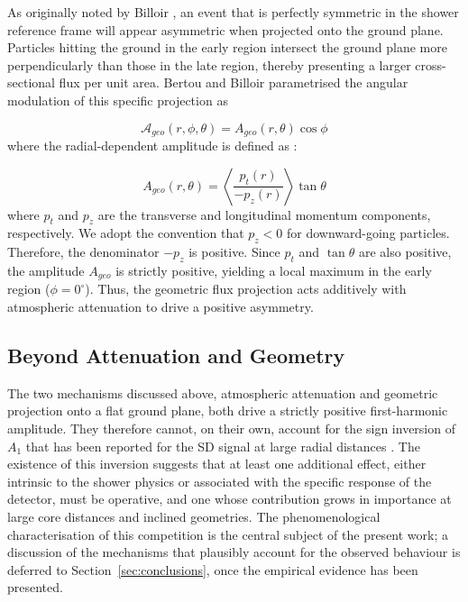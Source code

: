 \documentclass[11pt,a4paper]{article}
\begin{document}
As originally noted by Billoir \cite{GAP2000_017}, an event that is perfectly symmetric in the shower reference frame will appear asymmetric when projected onto the ground plane. Particles hitting the ground in the early region intersect the ground plane more perpendicularly than those in the late region, thereby presenting a larger cross-sectional flux per unit area. Bertou and Billoir parametrised the angular modulation of this specific projection as

\begin{equation}
    \mathcal{A}_{geo}(r, \phi, \theta) = A_{geo}(r, \theta) \cos \phi
    \label{eq:geometric_effect_full}
\end{equation}
%
where the radial-dependent amplitude is defined as \cite{GAP2000_017}:

\begin{equation}
    A_{geo}(r, \theta) = \left\langle \frac{p_t(r)}{-p_z(r)} \right\rangle \tan \theta
    \label{eq:geometric_effect}
\end{equation}
%
where $p_t$ and $p_z$ are the transverse and longitudinal momentum components, respectively. We adopt the convention that $p_z < 0$ for downward-going particles. Therefore, the denominator $-p_z$ is positive. Since $p_t$ and $\tan\theta$ are also positive, the amplitude $A_{geo}$ is strictly positive, yielding a local maximum in the early region ($\phi = 0^\circ$). Thus, the geometric flux projection acts additively with atmospheric attenuation to drive a positive asymmetry.

\subsection{Beyond Attenuation and Geometry}
\label{subsec:beyond}

The two mechanisms discussed above, atmospheric attenuation and geometric projection onto a flat ground plane, both drive a strictly positive first-harmonic amplitude. They therefore cannot, on their own, account for the sign inversion of $A_1$ that has been reported for the SD signal at large radial distances \cite{BradfieldThesis, Luce_ICRC2021, GAP2000_017}. The existence of this inversion suggests that at least one additional effect, either intrinsic to the shower physics or associated with the specific response of the detector, must be operative, and one whose contribution grows in importance at large core distances and inclined geometries. The phenomenological characterisation of this competition is the central subject of the present work; a discussion of the mechanisms that plausibly account for the observed behaviour is deferred to Section~\ref{sec:conclusions}, once the empirical evidence has been presented.
\end{document}
